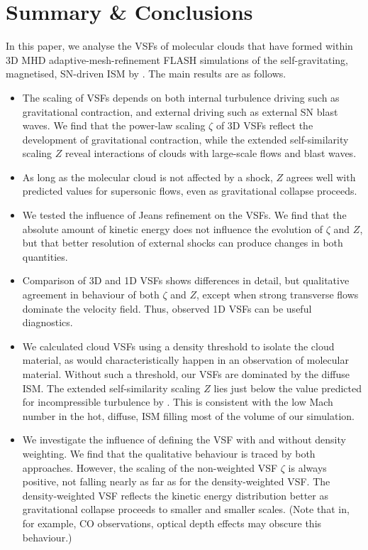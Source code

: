 \section{Summary \& Conclusions}\label{conclusions}

In this paper, we analyse the VSFs of molecular clouds that have formed within 3D MHD adaptive-mesh-refinement FLASH simulations of the self-gravitating, magnetised, SN-driven ISM by .
The main results are as follows.

\begin{itemize}
\item The scaling of VSFs depends on both internal turbulence driving such as gravitational contraction, and external driving such as external SN blast waves. We find that the power-law scaling $\zeta$ of 3D VSFs reflect the development of gravitational contraction, while the extended self-similarity scaling $Z$ reveal interactions of clouds with large-scale flows and blast waves.
\item As long as the molecular cloud is not affected by a shock, $Z$ agrees well with predicted values for supersonic flows, even as gravitational collapse proceeds.
\item We tested the influence of Jeans refinement on the VSFs. We find that the absolute amount of kinetic energy does not influence the evolution of $\zeta$ and $Z$, but that better resolution of external shocks can produce changes in both quantities.
\item Comparison of 3D and 1D VSFs shows differences in detail, but qualitative agreement in behaviour of both $\zeta$ and $Z$, except when strong transverse flows dominate the velocity field. Thus, observed 1D VSFs can be useful diagnostics. 
\item We calculated cloud VSFs using a density threshold to isolate the cloud material, as would characteristically happen in an observation of molecular material. Without such a threshold, our VSFs are dominated by the diffuse ISM. The extended self-similarity scaling $Z$ lies just below the value predicted for incompressible turbulence by \citet{She1994}. This is consistent with the low Mach number in the hot, diffuse, ISM filling most of the volume of our simulation.
\item We investigate the influence of defining the VSF with and without density weighting. We find that the qualitative behaviour is traced by both approaches. However, the scaling of the non-weighted VSF $\zeta$ is always positive, not falling nearly as far as for the density-weighted VSF. The density-weighted VSF reflects the kinetic energy distribution better as gravitational collapse proceeds to smaller and smaller scales. (Note that in, for example, CO observations, optical depth effects may obscure this behaviour.) 

\end{itemize}
